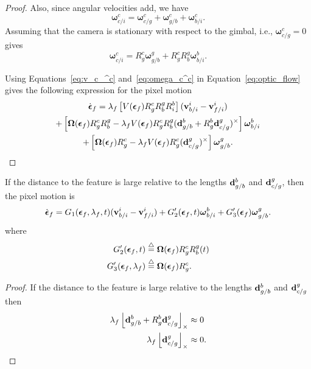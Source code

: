 \begin{proof}
Also, since angular velocities add, we have 
\[
\boldsymbol{\omega}_{c/i}^c = \boldsymbol{\omega}_{c/g}^c + \boldsymbol{\omega}_{g/b}^c + \boldsymbol{\omega}_{b/i}^c.
\]
Assuming that the camera is stationary with respect to the gimbal, i.e., $\boldsymbol{\omega}_{c/g}^c=0$ gives
\begin{equation} \label{eq:omega_c^c}
\boldsymbol{\omega}_{c/i}^c = R_g^c \boldsymbol{\omega}_{g/b}^g + R_g^c R_b^g \boldsymbol{\omega}_{b/i}^b.	
\end{equation}

Using Equations~\eqref{eq:v_c_^c} and~\eqref{eq:omega_c^c} in Equation~\eqref{eq:optic_flow} gives the following expression for the pixel motion
\begin{multline} \label{eq:optic_flow_full_pre}
\dot{\boldsymbol{\epsilon}}_f = \lambda_f \left[V(\epsilonbf_f) R_g^c R_b^g R_i^b \right] (\vbf_{b/i}^i-\vbf_{f/i}^i) \\
+ \left[\boldsymbol{\Omega}(\boldsymbol{\epsilon}_f)R_g^c R_b^g - \lambda_f V(\boldsymbol{\epsilon}_f) R_g^c R_b^g (\dbf_{g/b}^b+R_g^b \dbf_{c/g}^g)^\times \right] \omegabf_{b/i}^b \\
+ \left[\boldsymbol{\Omega}(\epsilonbf_f) R_g^c - \lambda_f V(\epsilonbf_f) R_g^c (\dbf_{c/g}^g)^\times \right] \omegabf_{g/b}^g.
\end{multline}

\end{proof}

\begin{corollary}
	If the distance to the feature is large relative to the lengths $\mathbf{d}_{g/b}^b$ and $\mathbf{d}_{c/g}^g$, then the pixel motion is
	\[
	\dot{\boldsymbol{\epsilon}}_f =G_1(\boldsymbol{\epsilon}_f, \lambda_f, t) (\mathbf{v}_{b/i}^i-\mathbf{v}_{f/i}^i)
	+ G_2'(\boldsymbol{\epsilon}_f, t) \boldsymbol{\omega}_{b/i}^b
	+ G_3'(\boldsymbol{\epsilon}_f) \boldsymbol{\omega}_{g/b}^g.
	\]
	where
	\begin{align*}
	G_2'(\boldsymbol{\epsilon}_f, t) & \stackrel{\triangle}{=}  \boldsymbol{\Omega}(\boldsymbol{\epsilon}_f)R_g^c R_b^g(t)  \\
	G_3'(\boldsymbol{\epsilon}_f, \lambda_f) & \stackrel{\triangle}{=} 	\boldsymbol{\Omega}(\boldsymbol{\epsilon}_f) R_g^c.
	\end{align*}
\end{corollary}
\begin{proof}
	If the distance to the feature is large relative to the lengths $\mathbf{d}_{g/b}^b$ and $\mathbf{d}_{c/g}^g$ then 
	\begin{align*}
	\lambda_f\left\lfloor\mathbf{d}_{g/b}^b + R_g^b\mathbf{d}_{c/g}^g\right\rfloor_{\times} &\approx 0 \\
	\lambda_f \left\lfloor\mathbf{d}_{c/g}^g\right\rfloor_{\times} &\approx 0.
	\end{align*}
\end{proof}

